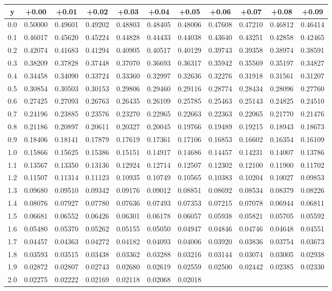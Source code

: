 \documentclass[]{book}
\theoremstyle{plain}
\theoremstyle{definition}
\theoremstyle{definition} %
\begin{document}
\begin{longtable}[]{@{}ccccccccccc@{}}
\toprule
y & +0.00 & +0.01 & +0.02 & +0.03 & +0.04 & +0.05 & +0.06 & +0.07 &
+0.08 & +0.09\tabularnewline
\midrule
\endhead
0.0 & 0.50000 & 0.49601 & 0.49202 & 0.48803 & 0.48405 & 0.48006 &
0.47608 & 0.47210 & 0.46812 & 0.46414\tabularnewline
0.1 & 0.46017 & 0.45620 & 0.45224 & 0.44828 & 0.44433 & 0.44038 &
0.43640 & 0.43251 & 0.42858 & 0.42465\tabularnewline
0.2 & 0.42074 & 0.41683 & 0.41294 & 0.40905 & 0.40517 & 0.40129 &
0.39743 & 0.39358 & 0.38974 & 0.38591\tabularnewline
0.3 & 0.38209 & 0.37828 & 0.37448 & 0.37070 & 0.36693 & 0.36317 &
0.35942 & 0.35569 & 0.35197 & 0.34827\tabularnewline
0.4 & 0.34458 & 0.34090 & 0.33724 & 0.33360 & 0.32997 & 0.32636 &
0.32276 & 0.31918 & 0.31561 & 0.31207\tabularnewline
0.5 & 0.30854 & 0.30503 & 0.30153 & 0.29806 & 0.29460 & 0.29116 &
0.28774 & 0.28434 & 0.28096 & 0.27760\tabularnewline
0.6 & 0.27425 & 0.27093 & 0.26763 & 0.26435 & 0.26109 & 0.25785 &
0.25463 & 0.25143 & 0.24825 & 0.24510\tabularnewline
0.7 & 0.24196 & 0.23885 & 0.23576 & 0.23270 & 0.22965 & 0.22663 &
0.22363 & 0.22065 & 0.21770 & 0.21476\tabularnewline
0.8 & 0.21186 & 0.20897 & 0.20611 & 0.20327 & 0.20045 & 0.19766 &
0.19489 & 0.19215 & 0.18943 & 0.18673\tabularnewline
0.9 & 0.18406 & 0.18141 & 0.17879 & 0.17619 & 0.17361 & 0.17106 &
0.16853 & 0.16602 & 0.16354 & 0.16109\tabularnewline
1.0 & 0.15866 & 0.15625 & 0.15386 & 0.15151 & 0.14917 & 0.14686 &
0.14457 & 0.14231 & 0.14007 & 0.13786\tabularnewline
1.1 & 0.13567 & 0.13350 & 0.13136 & 0.12924 & 0.12714 & 0.12507 &
0.12302 & 0.12100 & 0.11900 & 0.11702\tabularnewline
1.2 & 0.11507 & 0.11314 & 0.11123 & 0.10935 & 0.10749 & 0.10565 &
0.10383 & 0.10204 & 0.10027 & 0.09853\tabularnewline
1.3 & 0.09680 & 0.09510 & 0.09342 & 0.09176 & 0.09012 & 0.08851 &
0.08692 & 0.08534 & 0.08379 & 0.08226\tabularnewline
1.4 & 0.08076 & 0.07927 & 0.07780 & 0.07636 & 0.07493 & 0.07353 &
0.07215 & 0.07078 & 0.06944 & 0.06811\tabularnewline
1.5 & 0.06681 & 0.06552 & 0.06426 & 0.06301 & 0.06178 & 0.06057 &
0.05938 & 0.05821 & 0.05705 & 0.05592\tabularnewline
1.6 & 0.05480 & 0.05370 & 0.05262 & 0.05155 & 0.05050 & 0.04947 &
0.04846 & 0.04746 & 0.04648 & 0.04551\tabularnewline
1.7 & 0.04457 & 0.04363 & 0.04272 & 0.04182 & 0.04093 & 0.04006 &
0.03920 & 0.03836 & 0.03754 & 0.03673\tabularnewline
1.8 & 0.03593 & 0.03515 & 0.03438 & 0.03362 & 0.03288 & 0.03216 &
0.03144 & 0.03074 & 0.03005 & 0.02938\tabularnewline
1.9 & 0.02872 & 0.02807 & 0.02743 & 0.02680 & 0.02619 & 0.02559 &
0.02500 & 0.02442 & 0.02385 & 0.02330\tabularnewline
2.0 & 0.02275 & 0.02222 & 0.02169 & 0.02118 & 0.02068 & 0.02018 &

\end{longtable}
\end{document}
